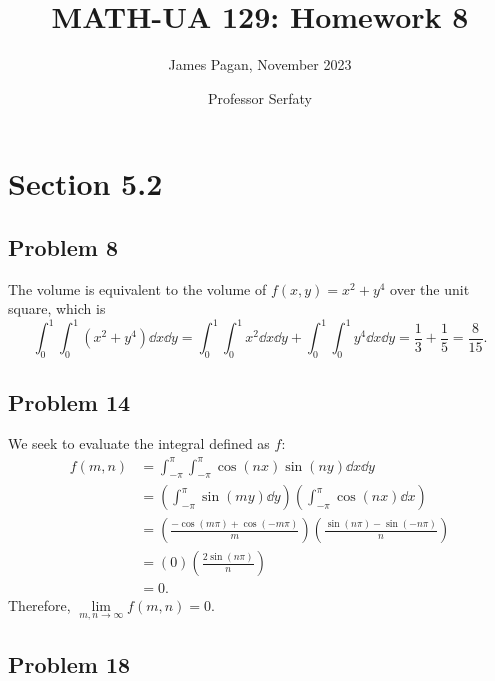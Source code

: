 \documentclass[11pt]{article}
\title{MATH-UA 129: Homework 8}
\author{James Pagan, November 2023}
\date{Professor Serfaty}
\begin{document}
\maketitle
\tableofcontents


\section{Section 5.2}

\subsection*{Problem 8}

The volume is equivalent to the volume of $f(x, y) = x^{2} + y^{4}$ over the unit square, which is
\[
	\int_{0}^{1} \int_{0}^{1} (x^{2} + y^{4}) \dd{x} \dd{y} = \int_{0}^{1} \int_{0}^{1} x^{2} \dd{x} \dd{y} + \int_{0}^{1} \int_{0}^{1} y^{4} \dd{x} \dd{y} = \frac{1}{3} + \frac{1}{5} = \boxed{\frac{8}{15}}.
\]


\subsection*{Problem 14}

We seek to evaluate the integral defined as $f$:
\begin{align*}
	f(m, n) &= \int_{-\pi}^{\pi} \int_{-\pi}^{\pi} \cos(nx) \sin(ny) \dd{x} \dd{y} \\
	&= \left(\int_{-\pi}^{\pi} \sin(my) \dd{y} \right) \left( \int_{-\pi}^{\pi} \cos(nx) \dd{x} \right) \\
	&= \left( \frac{-\cos(m \pi) + \cos(-m \pi)}{m} \right) \left( \frac{\sin(n \pi) - \sin(-n \pi)}{n} \right) \\
	&= (0) \left( \frac{2 \sin(n \pi)}{n} \right) \\
	&= 0.
\end{align*}
Therefore, $\lim\limits_{m, n \to \infty} f(m, n) = 0$.


\subsection*{Problem 18}
\end{document}
